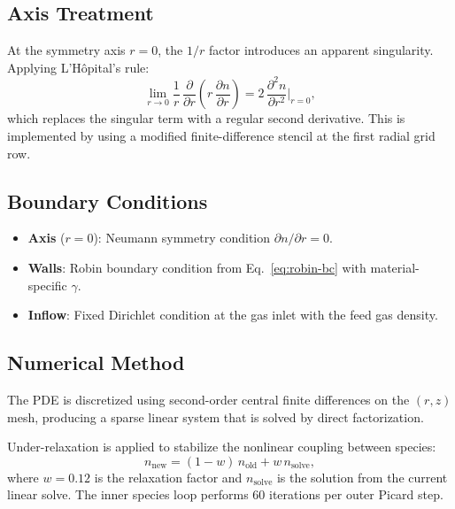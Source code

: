 \documentclass[11pt,a4paper]{report}
\begin{document}
\subsection{Axis Treatment}

At the symmetry axis $r = 0$, the $1/r$ factor introduces an apparent singularity.  Applying L'H\^opital's rule:
\begin{equation}
  \lim_{r \to 0} \frac{1}{r}\,\frac{\partial}{\partial r}\!\left(r\,\frac{\partial n}{\partial r}\right)
  = 2\,\frac{\partial^2 n}{\partial r^2}\bigg|_{r=0},
  \label{eq:lhopital-axis}
\end{equation}
which replaces the singular term with a regular second derivative.  This is implemented by using a modified finite-difference stencil at the first radial grid row.

\subsection{Boundary Conditions}

\begin{itemize}
  \item \textbf{Axis} ($r = 0$): Neumann symmetry condition $\partial n/\partial r = 0$.
  \item \textbf{Walls}: Robin boundary condition from Eq.~\eqref{eq:robin-bc} with material-specific $\gamma$.
  \item \textbf{Inflow}: Fixed Dirichlet condition at the gas inlet with the feed gas density.
\end{itemize}

\subsection{Numerical Method}

The PDE is discretized using second-order central finite differences on the $(r, z)$ mesh, producing a sparse linear system that is solved by direct factorization.

Under-relaxation is applied to stabilize the nonlinear coupling between species:
\begin{equation}
  n_\mathrm{new} = (1 - w)\,n_\mathrm{old} + w\,n_\mathrm{solve},
  \label{eq:under-relax}
\end{equation}
where $w = 0.12$ is the relaxation factor and $n_\mathrm{solve}$ is the solution from the current linear solve.  The inner species loop performs 60 iterations per outer Picard step.


\end{document}

